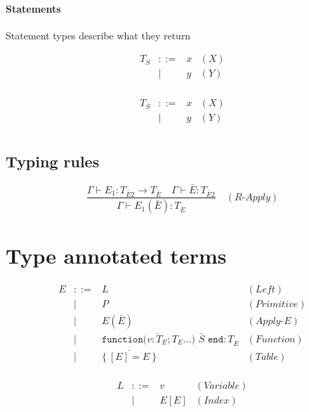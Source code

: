 \documentclass{article}
\newcommand{\Function}[2]{\texttt{function(}#1\texttt{)\ }#2\texttt{\  end}}
\newcommand{\Table}[1]{\{\ #1\ \}}
\newcommand{\eqlabel}[1]{(\textit{#1})}
\begin{document}
\paragraph{Statements}
Statement types describe what they return

\begin{equation}
\begin{array}{rcll}
T_S &::=& x & \eqlabel{X} \\
  &|&   y & \eqlabel{Y} \\
\end{array}
\end{equation}


\begin{equation}
\begin{array}{rcll}
T_{\bar S} &::=& x & \eqlabel{X} \\
  &|&   y & \eqlabel{Y} \\
\end{array}
\end{equation}

\subsection{Typing rules}

$$ \frac
  {\Gamma \vdash E_1: T_{\bar E 2} \rightarrow T_{\bar E}
    \quad
    \Gamma \vdash \bar E: T_{\bar E 2}}
  {\Gamma \vdash E_1(\bar E): T_{\bar E}}
  \quad
  (\textit{R-Apply})$$


\section{Type annotated terms}

\begin{equation}
\begin{array}{rcll}
E &::=& L & \eqlabel{Left} \\
  &|&   P & \eqlabel{Primitive} \\
  &|&   E(\bar E) & \eqlabel{Apply-E} \\
  &|&   \Function{\overline{v:T_E}; T_E...}{\bar S}:T_{\bar E} & \eqlabel{Function} \\
  &|&   \Table{ \overline{[E]=E} } & \eqlabel{Table} \\
\end{array}
\end{equation}

\begin{equation}
\begin{array}{rcll}
L &::=& v & \eqlabel{Variable} \\
  &|&   E[E] & \eqlabel{Index} \\
\end{array}
\end{equation}
\end{document}
